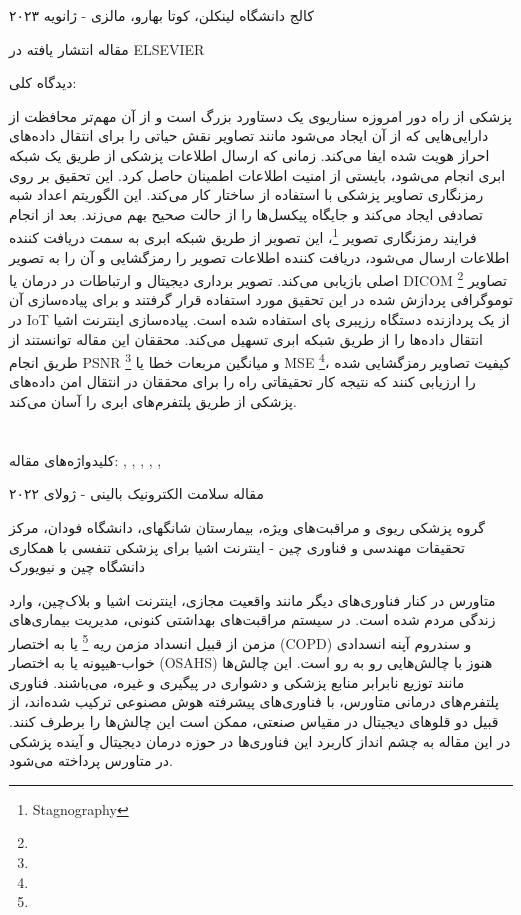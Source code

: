 \documentclass[10pt, a4paper]{article}
\begin{document}
کالج دانشگاه لینکلن، کوتا بهارو، مالزی - ژانویه ۲۰۲۳

مقاله انتشار یافته در ELSEVIER

دیدگاه کلی:

پزشکی از راه دور امروزه سناریوی یک دستاورد بزرگ است و از آن مهم‌تر محافظت از
دارایی‌هایی که از آن ایجاد می‌شود مانند تصاویر نقش حیاتی را برای انتقال داده‌های
احراز هویت شده ایفا می‌کند. زمانی که ارسال اطلاعات پزشکی از طریق یک شبکه ابری
انجام می‌شود، بایستی از امنیت اطلاعات اطمینان حاصل کرد. این تحقیق بر روی
رمزنگاری تصاویر پزشکی با استفاده از ساختار 
کار می‌کند. این الگوریتم اعداد شبه تصادفی ایجاد می‌کند و جایگاه پیکسل‌ها را از
حالت صحیح بهم می‌زند. بعد از انجام فرایند رمزنگاری تصویر
\footnote{Stagnography}، این تصویر از طریق شبکه ابری به سمت دریافت کننده اطلاعات
ارسال می‌شود، دریافت کننده اطلاعات تصویر را رمزگشایی و آن را به تصویر اصلی
بازیابی می‌کند. تصویر برداری دیجیتال و ارتباطات در درمان یا DICOM
\footnote{} تصاویر توموگرافی
پردازش شده در این تحقیق مورد استفاده قرار گرفتند و برای پیاده‌سازی آن در IoT از
یک پردازنده دستگاه رزپبری پای  استفاده شده است. پیاده‌سازی اینترنت اشیا
انتقال داده‌ها را از طریق شبکه ابری تسهیل می‌کند. محققان این مقاله توانستند از
طریق انجام PSNR \footnote{} و میانگین مربعات خطا
یا MSE \footnote{}، کیفیت تصاویر رمزگشایی شده را ارزیابی
کنند که نتیجه کار تحقیقاتی راه را برای محققان در انتقال امن داده‌های پزشکی از
طریق پلتفرم‌های ابری را آسان می‌کند.

\newpage


\section{}

کلیدواژه‌های مقاله: 
,
,
,
,
,

مقاله سلامت الکترونیک بالینی - ژولای ۲۰۲۲

گروه پزشکی ریوی و مراقبت‌های ویژه، بیمارستان شانگهای، دانشگاه فودان، مرکز
تحقیقات مهندسی و فناوری چین - اینترنت اشیا برای پزشکی تنفسی با همکاری دانشگاه
چین و نیویورک

متاورس در کنار فناوری‌های دیگر مانند واقعیت مجازی، اینترنت اشیا و بلاک‌چین، وارد
زندگی مردم شده است. در سیستم مراقبت‌های بهداشتی کنونی، مدیریت بیماری‌های مزمن از
قبیل انسداد مزمن ریه \footnote{} یا
به اختصار (COPD) و سندروم آپنه انسدادی خواب-هیپونه یا به اختصار (OSAHS) هنوز با
چالش‌هایی رو به رو است. این چالش‌ها مانند توزیع نابرابر منابع پزشکی و دشواری در
پیگیری و غیره، می‌باشند. فناوری پلتفرم‌های درمانی متاورس، با فناوری‌های پیشرفته
هوش مصنوعی ترکیب شد‌ه‌اند، از قبیل دو قلو‌های دیجیتال در مقیاس صنعتی، ممکن است
این چالش‌ها را برطرف کنند. در این مقاله به چشم انداز کاربرد این فناوری‌ها در
حوزه درمان دیجیتال و آینده پزشکی در متاورس پرداخته می‌شود.
\end{document}
